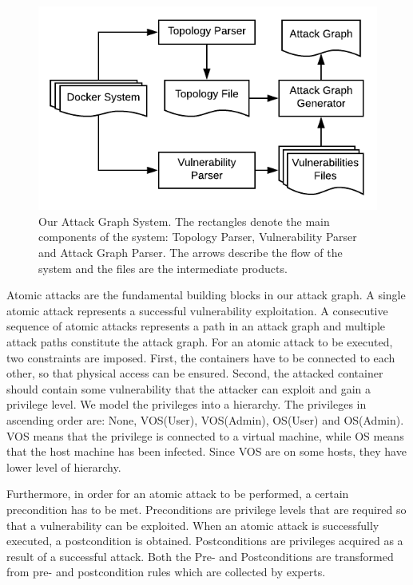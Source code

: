 \documentclass[letterpaper, 10 pt, conference]{ieeeconf}  %
\begin{document}
\begin{figure}
	\includegraphics[width=\textwidth]{AttackGraphSystem}
	\caption{Our Attack Graph System. The rectangles denote the main components of the system: Topology Parser, Vulnerability Parser and Attack Graph Parser. The arrows describe the flow of the system and the files are the intermediate products.}
	\label{AttackGraphSystem}
\end{figure}


Atomic attacks are the fundamental building blocks in our attack graph. A single atomic attack represents a successful vulnerability exploitation. A consecutive sequence of atomic attacks represents a path in an attack graph and multiple attack paths constitute the attack graph. For an atomic attack to be executed, two constraints are imposed. First, the containers have to be connected to each other, so that physical access can be ensured. Second, the attacked container should contain some vulnerability that the attacker can exploit and gain a privilege level. We model the privileges into a hierarchy. The privileges in ascending order are: None, VOS(User), VOS(Admin), OS(User) and OS(Admin). VOS means that the privilege is connected to a virtual machine, while OS means that the host machine has been infected. Since VOS are on some hosts, they have lower level of hierarchy.

Furthermore, in order for an atomic attack to be performed, a certain precondition has to be met. Preconditions are privilege levels that are required so that a vulnerability can be exploited. When an atomic attack is successfully executed, a postcondition is obtained. Postconditions are privileges acquired as a result of a successful attack. Both the Pre- and Postconditions are transformed from pre- and postcondition rules which are collected by experts.
\end{document}
